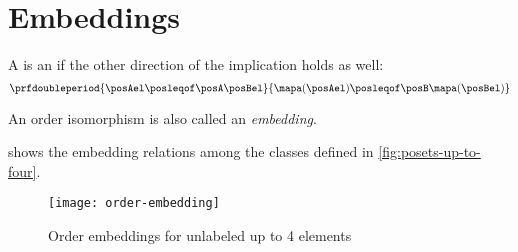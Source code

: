 \section{Embeddings}

\begin{ctdefinition}
    \label{def:order-isomorphism}
    A  is an  if the other direction of the implication holds as well:
    \begin{equation}
        \prfdoubleperiod{
            \posAel \posleqof\posA \posBel
        }{
            \mapa(\posAel) \posleqof\posB \mapa(\posBel)
        }
    \end{equation}
\end{ctdefinition}

An order isomorphism is also called an \emph{embedding}.

 shows the embedding relations among the  classes defined in \cref{fig:posets-up-to-four}.

\begin{figure*}
    \texttt{[image: order-embedding]}
    \caption{Order embeddings for unlabeled  up to 4 elements}
    \label{fig:order-embedding}
\end{figure*}
